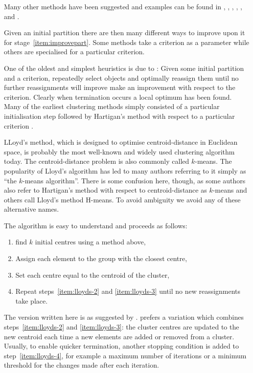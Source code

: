 \documentclass[a4paper]{report}
\begin{document}
Many other methods have been suggested and examples can be found in
\citep{he2004initialization}, \citep{khan2004clusterecenter},
\citep{cao09initialization}, \citep{yedla2010enhancing},
\citep{zhang2009initialcenters}, \citep{Erisoglu2011intiailcenters} and
\citep{redmond2007method}.

Given an initial partition there are then many different ways to improve upon
it for stage~\ref{item:improvepart}.  Some methods take a criterion as a
parameter while others are specialised for a particular criterion.

One of the oldest and simplest heuristics is due to
\citet{hartigan1975clustering}:  Given some initial partition and a criterion,
repeatedly select objects and optimally reassign them until no further
reassignments will improve make an improvement with respect to the criterion.
Clearly when termination occurs a local optimum has been found.  Many of the
earliest clustering methods simply consisted of a particular initialisation
step followed by Hartigan's method with respect to a particular criterion
\citep{everitt80}.

LLoyd's method, which is designed to optimise centroid-distance in Euclidean
space, is probably the most well-known and widely used clustering algorithm
today.  The centroid-distance problem is also commonly called $k$-means.  The
popularity of Lloyd's algorithm has led to many authors referring to it simply
as ``the $k$-means algorithm''.  There is some confusion here, though, as some
authors also refer to Hartigan's method with respect to centroid-distance as
$k$-means and others call Lloyd's method H-means.  To avoid ambiguity we avoid
any of these alternative names.

The algorithm is easy to understand and proceeds as follows:
\begin{enumerate}
\item find $k$ initial centres using a method above,
\item \label{item:lloyds-2} Assign each element to the group with the closest
  centre,
\item \label{item:lloyds-3} Set each centre equal to the centroid of the
  cluster,
\item \label{item:lloyds-4} Repeat steps~\ref{item:lloyds-2} and
  \ref{item:lloyds-3} until no new reassignments take place.
\end{enumerate}

The version written here is as suggested by \citet{ballhall67clustering}.
\citet{macqueen1967some} prefers a variation which combines
steps~\ref{item:lloyds-2} and \ref{item:lloyds-3}: the cluster centres are
updated to the new centroid each time a new elements are added or removed from
a cluster.  Usually, to enable quicker termination, another stopping condition
is added to step~\ref{item:lloyds-4}, for example a maximum number of
iterations or a minimum threshold for the changes made after each iteration.
\end{document}
